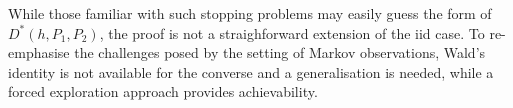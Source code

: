 {While those familiar with such stopping problems may easily guess the form of $D^*(h,P_1,P_2)$, the proof is not a straighforward extension of the iid case. To re-emphasise the challenges posed by the setting of Markov observations, Wald's identity is not available for the converse and a generalisation is needed, while a forced exploration approach provides achievability.}


%
